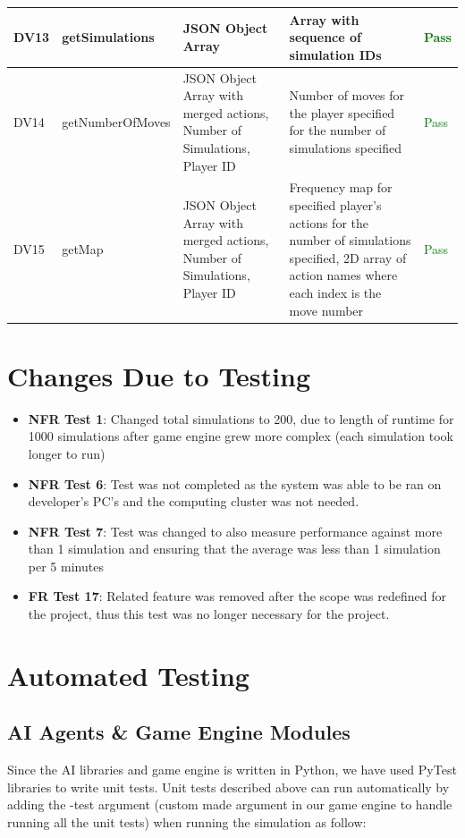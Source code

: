 \documentclass[12pt, titlepage]{article}
\begin{document}
\newpage
\begin{table}[!ht]
\begin{tabular}{| P{3em} | P{9em} | P{7em} | P{7em} | P{7em} |}
    \hline
        DV13 & getSimulations & JSON Object Array & Array with sequence of simulation IDs & \textcolor{green}{Pass} \\ \hline
        DV14 & getNumberOfMoves & JSON Object Array with merged actions, Number of Simulations, Player ID & Number of moves for the player specified for the number of simulations specified & \textcolor{green}{Pass} \\ \hline
        DV15 & getMap & JSON Object Array with merged actions, Number of Simulations, Player ID & Frequency map for specified player's actions for the number of simulations specified, 2D array of action names where each index is the move number & \textcolor{green}{Pass} \\ \hline
\end{tabular}
\end{table}

\clearpage
\section{Changes Due to Testing}
\begin{itemize}
    \item \textbf{NFR Test 1}: Changed total simulations to 200, due to length of runtime for 1000 simulations after game engine grew more complex (each simulation took longer to run)
    \item \textbf{NFR Test 6}: Test was not completed as the system was able to be ran on developer's PC's and the computing cluster was not needed.
    \item \textbf{NFR Test 7}: Test was changed to also measure performance against more than 1 simulation and ensuring that the average was less than 1 simulation per 5 minutes
    \item \textbf{FR Test 17}: Related feature was removed after the scope was redefined for the project, thus this test was no longer necessary for the project.
\end{itemize}

\section{Automated Testing}
\subsection{AI Agents & Game Engine Modules}
Since the AI libraries and game engine is written in Python, we have used PyTest libraries to write unit tests. Unit tests described above can run automatically by adding the -test argument (custom made argument in our game engine to handle running all the unit tests) when running the simulation as follow:
\end{document}
